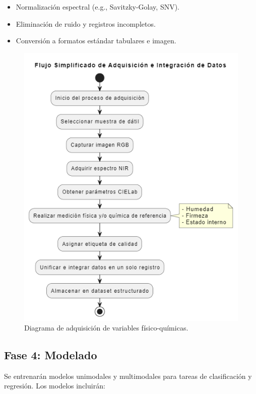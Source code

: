 \begin{itemize}
    \item Normalización espectral (e.g., Savitzky-Golay, SNV).
    \item Eliminación de ruido y registros incompletos.
    \item Conversión a formatos estándar tabulares e imagen.
\end{itemize}

\begin{figure}[th]
\centering
\includegraphics[scale=0.75]{Figures/adquisicion.png}
\decoRule
\caption[Diagrama de adquisicion]{Diagrama de adquisición de variables físico-químicas.}
\label{fig:Diagrama_Adquisicion}
\end{figure}

\subsection{Fase 4: Modelado}

Se entrenarán modelos unimodales y multimodales para tareas de clasificación y regresión. Los modelos incluirán:

